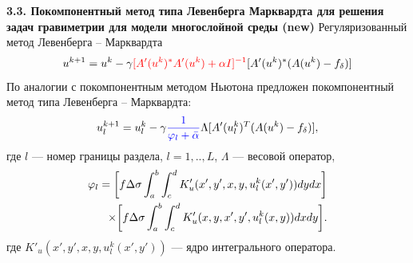 \documentclass[10pt,pdf, mathserif, hyperref={unicode}]{beamer}
\begin{document}

\begin{frame}{\small\textbf{3.3. Покомпонентный метод типа Левенберга Марквардта для решения задач гравиметрии для модели многослойной среды \textbf{(new)}}}
	Регуляризованный метод Левенберга -- Марквардта %
	$$	u^{k+1}=u^k-\gamma{\color{red}[A'(u^k)^*A'(u^k)+\alpha I]^{-1} }[A'(u^k)^*(A(u^k)-f_\delta)]$$
	По аналогии с покомпонентным методом Ньютона предложен покомпонентный метод типа Левенберга -- Марквардта:
	$$ u_l^{k+1}=u_l^k-\gamma{\color{blue}\frac{1}{\varphi_l+\bar{\alpha}}}\Lambda[ A'(u_l^k)^T(A(u^k)-f_\delta)],$$
	где $l$ --- номер границы раздела, $l=1,..,L$, $\Lambda$ --- весовой оператор, 
	\begin{equation*}
	\begin{aligned}
	\varphi_l=\bigg[ f\Delta\sigma\int_{a}^{b}\int_{c}^{d}
	K'_u(x',y', x, y, u_l^k(x',y'))dydx\bigg] \notag \\ \times\bigg[f\Delta\sigma\int_{a}^{b}\int_{c}^{d}K'_u(x,y, x',y',u_l^k(x,y))dxdy\bigg]. 
	\end{aligned}
	\end{equation*} 
	где $K'_u(x',y', x, y, u_l^k(x',y'))$ --- ядро интегрального оператора. %
	\let\thefootnote\relax\let\thefootnote\relax{}

\end{frame}
\end{document}

